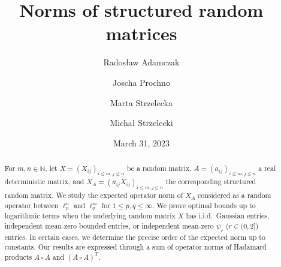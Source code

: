 \documentclass[a4paper]{amsart}
\theoremstyle{definition}
\theoremstyle{remark}
\numberwithin{equation}{section}
\begin{document}
\title[Norms of structured matrices]{Norms of structured random matrices}

\author[R. Adamczak]{Rados\l{}aw Adamczak}
\address{Rados{\l}aw Adamczak, Institute of Mathematics, University of Warsaw, Banacha 2, 02--097 Warsaw, Poland.}

\author[J. Prochno]{Joscha Prochno}
\address{Joscha Prochno, Faculty of Computer Science and Mathematics, University of Passau, Innstra{\ss}e 33, 94032 Passau, Germany.}

\author[M. Strzelecka]{Marta Strzelecka}
\address{Marta Strzelecka, Institute of Mathematics and Scientific Computing, University of Graz, Heinrichstra{\ss}e 36, 8010 Graz, Austria; 
	Institute of Mathematics, University of Warsaw, Banacha 2, 02--097 Warsaw, Poland.}

\author[M. Strzelecki]{Micha\l{} Strzelecki}
\address{Micha{\l} Strzelecki, Institute of Mathematics, University of Warsaw, Banacha 2, 02--097 Warsaw, Poland.}


\begin{abstract}
For $m,n\in\mathbb{N}$, let $X=(X_{ij})_{i\leq m,j\leq n}$ be a random matrix,
$A=(a_{ij})_{i\leq m,j\leq n}$ a real deterministic matrix,
and $X_A=(a_{ij}X_{ij})_{i\leq m,j\leq n}$ the corresponding structured random matrix.
We study the expected operator norm of $X_A$ considered as a random operator between $\ell_p^n$ and $\ell_q^m$ for $1\leq p,q \leq \infty$.
We prove optimal bounds up to logarithmic terms when the underlying random matrix $X$ has i.i.d.\ Gaussian entries,
independent mean-zero  bounded entries,
or independent mean-zero $\psi_r$ ($r\in(0,2]$) entries.
In certain cases, we determine the precise order of the expected norm up to constants. Our results are expressed through a sum of operator norms of Hadamard products $A\circ A$ and $(A\circ A)^T$.
\end{abstract}


\date{March 31, 2023}

\end{document}
